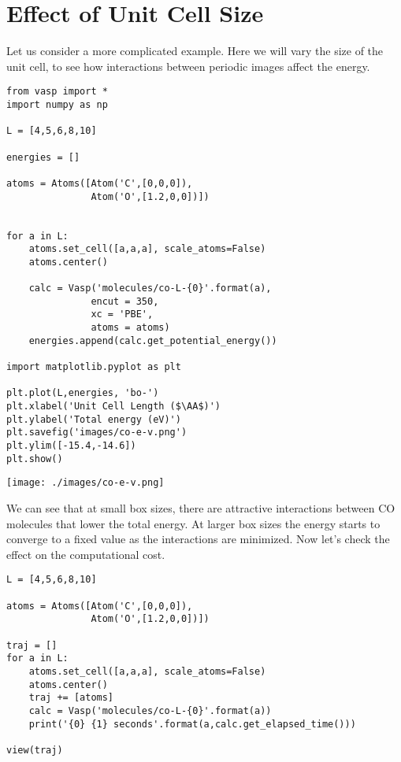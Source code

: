 \documentclass[11pt]{article}
\begin{document}
\section{Effect of Unit Cell Size}
\label{sec:orgb54cd3c}

Let us consider a more complicated example. Here we will vary the size of the unit cell, to see how interactions between periodic images affect the energy.

\begin{verbatim}
from vasp import *
import numpy as np

L = [4,5,6,8,10]

energies = []

atoms = Atoms([Atom('C',[0,0,0]),
               Atom('O',[1.2,0,0])])


for a in L:
    atoms.set_cell([a,a,a], scale_atoms=False)
    atoms.center()

    calc = Vasp('molecules/co-L-{0}'.format(a),
               encut = 350,
               xc = 'PBE',
               atoms = atoms)
    energies.append(calc.get_potential_energy())
        
import matplotlib.pyplot as plt

plt.plot(L,energies, 'bo-')
plt.xlabel('Unit Cell Length ($\AA$)')
plt.ylabel('Total energy (eV)')
plt.savefig('images/co-e-v.png')
plt.ylim([-15.4,-14.6])
plt.show()
\end{verbatim}

\begin{center}
\texttt{[image: ./images/co-e-v.png]}
\end{center}


We can see that at small box sizes, there are attractive interactions between CO molecules that lower the total energy. At larger box sizes the energy starts to converge to a fixed value as the interactions are minimized. Now let's check the effect on the computational cost.

\begin{verbatim}
L = [4,5,6,8,10]

atoms = Atoms([Atom('C',[0,0,0]),
               Atom('O',[1.2,0,0])])

traj = []
for a in L:
    atoms.set_cell([a,a,a], scale_atoms=False)
    atoms.center()
    traj += [atoms]
    calc = Vasp('molecules/co-L-{0}'.format(a))
    print('{0} {1} seconds'.format(a,calc.get_elapsed_time()))
    
view(traj)
\end{verbatim}
\end{document}
